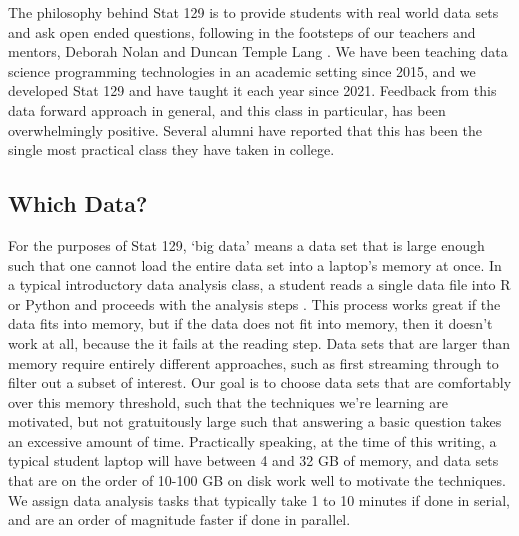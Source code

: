 \documentclass[12pt]{article}
\begin{document}
The philosophy behind Stat 129 is to provide students with real world data sets and ask open ended questions, following in the footsteps of our teachers and mentors, Deborah Nolan and Duncan Temple Lang \cite{nolan2010computing}.
We have been teaching data science programming technologies in an academic setting since 2015, and we developed Stat 129 and have taught it each year since 2021.
Feedback from this data forward approach in general, and this class in particular, has been overwhelmingly positive.
Several alumni have reported that this has been the single most practical class they have taken in college.

\subsection{Which Data?}
\label{sec:data}

For the purposes of Stat 129, `big data' means a data set that is large enough such that one cannot load the entire data set into a laptop's memory at once.
In a typical introductory data analysis class, a student reads a single data file into R or Python and proceeds with the analysis steps \cite{dsbox}.
This process works great if the data fits into memory, but if the data does not fit into memory, then it doesn't work at all, because the it fails at the reading step.
Data sets that are larger than memory require entirely different approaches, such as first streaming through to filter out a subset of interest.
Our goal is to choose data sets that are comfortably over this memory threshold, such that the techniques we're learning are motivated, but not gratuitously large such that answering a basic question takes an excessive amount of time.
Practically speaking, at the time of this writing, a typical student laptop will have between 4 and 32 GB of memory, and data sets that are on the order of 10-100 GB on disk work well to motivate the techniques.
We assign data analysis tasks that typically take 1 to 10 minutes if done in serial, and are an order of magnitude faster if done in parallel.
\end{document}
